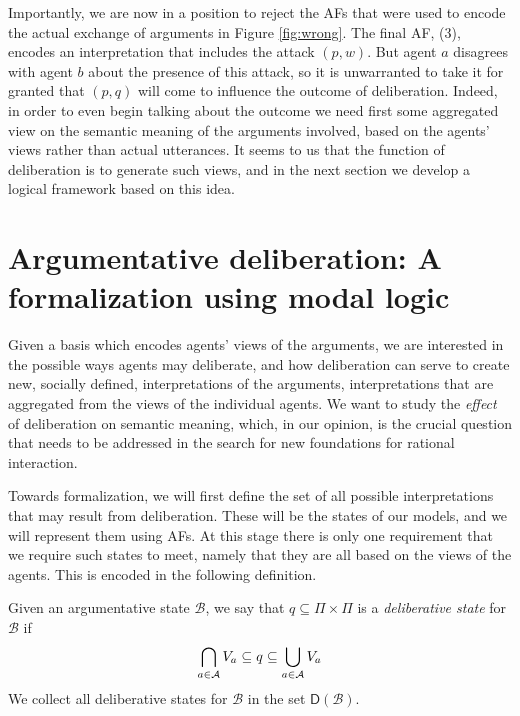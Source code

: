 \documentclass[greybox]{svmult}
\newcommand{\dstate}[1]{\mathsf D({#1}) }
\newcommand{\views}{\mathcal B}
\begin{document}
Importantly, we are now in a position to reject the AFs that were used to encode the actual exchange of arguments in Figure \ref{fig:wrong}. The final AF, (3), encodes an interpretation that includes the attack $(p,w)$. But agent $a$ disagrees with agent $b$ about the presence of this attack, so it is unwarranted to take it for granted that $(p,q)$ will come to influence the outcome of deliberation. Indeed, in order to even begin talking about the outcome we need first some aggregated view on the semantic meaning of the arguments involved, based on the agents' views rather than actual utterances. It seems to us that the function of deliberation is to generate such views, and in the next section we develop a logical framework based on this idea.

\section{Argumentative deliberation: A formalization using modal logic}\label{sec:ddl}

Given a basis which encodes agents' views of the arguments, we are interested in the possible ways agents may deliberate, and how deliberation can serve to create new, socially defined, interpretations of the arguments, interpretations that are aggregated from the views of the individual agents.  We want to study the \emph{effect} of deliberation on semantic meaning, which, in our opinion, is the crucial question that needs to be addressed in the search for new foundations for rational interaction.

Towards formalization, we will first define the set of all possible interpretations that may result from deliberation. These will be the states of our models, and we will represent them using AFs. At this stage there is only one requirement that we require such states to meet, namely that they are all based on the views of the agents. This is encoded in the following definition.
\begin{definition}\label{def:dstate}
Given an argumentative state $\views$, we say that $q \subseteq \Pi \times \Pi$ is a \emph{deliberative state} for $\views$ if
\begin{equation}\label{eq:ds}
\bigcap_{a \in \agents}V_a \subseteq q \subseteq \bigcup_{a \in \agents}V_a
\end{equation}
We collect all deliberative states for $\views$ in the set $\dstate \views$. 
\end{definition}
\end{document}
